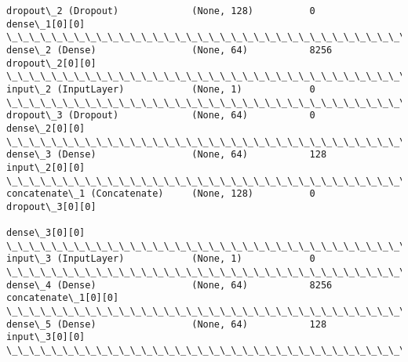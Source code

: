 \documentclass[11pt]{article}
\begin{document}
\begin{Verbatim}[commandchars=\\\{\}]
dropout\_2 (Dropout)             (None, 128)          0           dense\_1[0][0]                    
\_\_\_\_\_\_\_\_\_\_\_\_\_\_\_\_\_\_\_\_\_\_\_\_\_\_\_\_\_\_\_\_\_\_\_\_\_\_\_\_\_\_\_\_\_\_\_\_\_\_\_\_\_\_\_\_\_\_\_\_\_\_\_\_\_\_\_\_\_\_\_\_\_\_\_\_\_\_\_\_\_\_\_\_\_\_\_\_\_\_\_\_\_\_\_\_\_\_
dense\_2 (Dense)                 (None, 64)           8256        dropout\_2[0][0]                  
\_\_\_\_\_\_\_\_\_\_\_\_\_\_\_\_\_\_\_\_\_\_\_\_\_\_\_\_\_\_\_\_\_\_\_\_\_\_\_\_\_\_\_\_\_\_\_\_\_\_\_\_\_\_\_\_\_\_\_\_\_\_\_\_\_\_\_\_\_\_\_\_\_\_\_\_\_\_\_\_\_\_\_\_\_\_\_\_\_\_\_\_\_\_\_\_\_\_
input\_2 (InputLayer)            (None, 1)            0                                            
\_\_\_\_\_\_\_\_\_\_\_\_\_\_\_\_\_\_\_\_\_\_\_\_\_\_\_\_\_\_\_\_\_\_\_\_\_\_\_\_\_\_\_\_\_\_\_\_\_\_\_\_\_\_\_\_\_\_\_\_\_\_\_\_\_\_\_\_\_\_\_\_\_\_\_\_\_\_\_\_\_\_\_\_\_\_\_\_\_\_\_\_\_\_\_\_\_\_
dropout\_3 (Dropout)             (None, 64)           0           dense\_2[0][0]                    
\_\_\_\_\_\_\_\_\_\_\_\_\_\_\_\_\_\_\_\_\_\_\_\_\_\_\_\_\_\_\_\_\_\_\_\_\_\_\_\_\_\_\_\_\_\_\_\_\_\_\_\_\_\_\_\_\_\_\_\_\_\_\_\_\_\_\_\_\_\_\_\_\_\_\_\_\_\_\_\_\_\_\_\_\_\_\_\_\_\_\_\_\_\_\_\_\_\_
dense\_3 (Dense)                 (None, 64)           128         input\_2[0][0]                    
\_\_\_\_\_\_\_\_\_\_\_\_\_\_\_\_\_\_\_\_\_\_\_\_\_\_\_\_\_\_\_\_\_\_\_\_\_\_\_\_\_\_\_\_\_\_\_\_\_\_\_\_\_\_\_\_\_\_\_\_\_\_\_\_\_\_\_\_\_\_\_\_\_\_\_\_\_\_\_\_\_\_\_\_\_\_\_\_\_\_\_\_\_\_\_\_\_\_
concatenate\_1 (Concatenate)     (None, 128)          0           dropout\_3[0][0]                  
                                                                 dense\_3[0][0]                    
\_\_\_\_\_\_\_\_\_\_\_\_\_\_\_\_\_\_\_\_\_\_\_\_\_\_\_\_\_\_\_\_\_\_\_\_\_\_\_\_\_\_\_\_\_\_\_\_\_\_\_\_\_\_\_\_\_\_\_\_\_\_\_\_\_\_\_\_\_\_\_\_\_\_\_\_\_\_\_\_\_\_\_\_\_\_\_\_\_\_\_\_\_\_\_\_\_\_
input\_3 (InputLayer)            (None, 1)            0                                            
\_\_\_\_\_\_\_\_\_\_\_\_\_\_\_\_\_\_\_\_\_\_\_\_\_\_\_\_\_\_\_\_\_\_\_\_\_\_\_\_\_\_\_\_\_\_\_\_\_\_\_\_\_\_\_\_\_\_\_\_\_\_\_\_\_\_\_\_\_\_\_\_\_\_\_\_\_\_\_\_\_\_\_\_\_\_\_\_\_\_\_\_\_\_\_\_\_\_
dense\_4 (Dense)                 (None, 64)           8256        concatenate\_1[0][0]              
\_\_\_\_\_\_\_\_\_\_\_\_\_\_\_\_\_\_\_\_\_\_\_\_\_\_\_\_\_\_\_\_\_\_\_\_\_\_\_\_\_\_\_\_\_\_\_\_\_\_\_\_\_\_\_\_\_\_\_\_\_\_\_\_\_\_\_\_\_\_\_\_\_\_\_\_\_\_\_\_\_\_\_\_\_\_\_\_\_\_\_\_\_\_\_\_\_\_
dense\_5 (Dense)                 (None, 64)           128         input\_3[0][0]                    
\_\_\_\_\_\_\_\_\_\_\_\_\_\_\_\_\_\_\_\_\_\_\_\_\_\_\_\_\_\_\_\_\_\_\_\_\_\_\_\_\_\_\_\_\_\_\_\_\_\_\_\_\_\_\_\_\_\_\_\_\_\_\_\_\_\_\_\_\_\_\_\_\_\_\_\_\_\_\_\_\_\_\_\_\_\_\_\_\_\_\_\_\_\_\_\_\_\_

\end{Verbatim}
\end{document}
